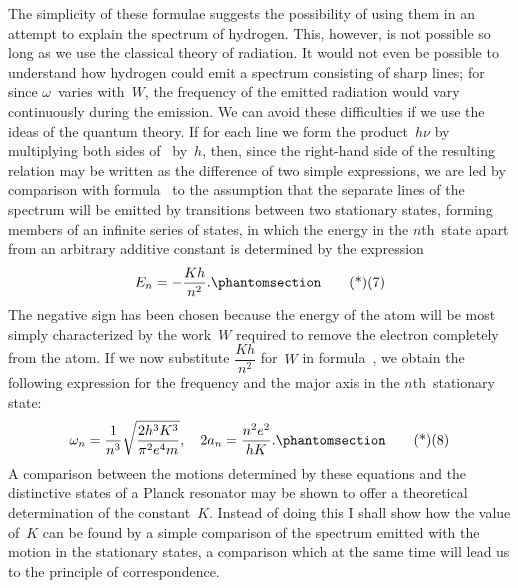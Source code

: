 The simplicity of these formulae suggests the possibility of using
them in an attempt to explain the spectrum of hydrogen. This,
however, is not possible so long as we use the classical theory of
radiation. It would not even be possible to understand how hydrogen
could emit a spectrum consisting of sharp lines; for since $\omega$~varies
with~$W$, the frequency of the emitted radiation would vary continuously
during the emission. We can avoid these difficulties if
we use the ideas of the quantum theory. If for each line we form
the product~$h\nu$ by multiplying both sides of~ by~$h$, then, since
the right-hand side of the resulting relation may be written as
the difference of two simple expressions, we are led by comparison
with formula~ to the assumption that the separate lines of the
spectrum will be emitted by transitions between two stationary
states, forming members of an infinite series of states, in which the
energy in the $n$th~state apart from an arbitrary additive constant is
determined by the expression
\[
E_{n} = -\frac{Kh}{n^{2}}.
\Tag{(7)}
\]
The negative sign has been chosen because the energy of the atom
will be most simply characterized by the work~$W$ required to remove
the electron completely from the atom. If we now substitute $\dfrac{Kh}{n^{2}}$
for~$W$ in formula~, we obtain the following expression for the frequency
and the major axis in the $n$th~stationary state:
\[
\omega_{n} = \frac{1}{n^{3}} \sqrt{\frac{2h^{3} K^{3}}{\pi^{2} e^{4} m}},\quad
2a_{n} = \frac{n^{2} e^{2}}{hK}.
\Tag{(8)}
\]
A comparison between the motions determined by these equations
and the distinctive states of a Planck resonator may be shown to
offer a theoretical determination of the constant~$K$. Instead of
doing this I shall show how the value of~$K$ can be found by a simple
comparison of the spectrum emitted with the motion in the stationary
states, a comparison which at the same time will lead us to the
principle of correspondence.

